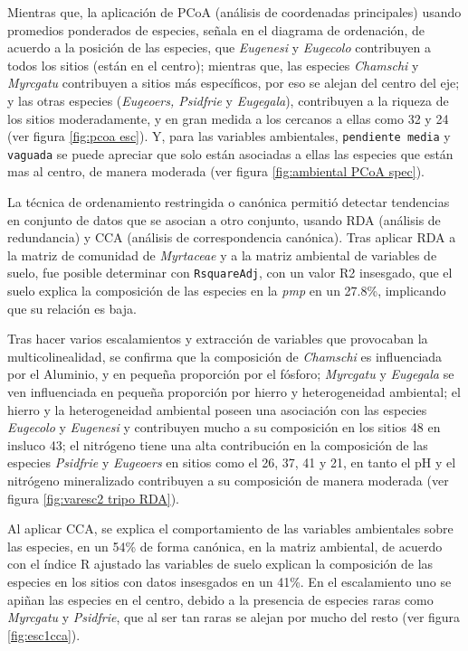 \documentclass[11pt,]{article}
\begin{document}
Mientras que, la aplicación de PCoA (análisis de coordenadas
principales) usando promedios ponderados de especies, señala en el
diagrama de ordenación, de acuerdo a la posición de las especies, que
\emph{Eugenesi} y \emph{Eugecolo} contribuyen a todos los sitios (están
en el centro); mientras que, las especies \emph{Chamschi} y
\emph{Myrcgatu} contribuyen a sitios más específicos, por eso se alejan
del centro del eje; y las otras especies (\emph{Eugeoers, Psidfrie} y
\emph{Eugegala}), contribuyen a la riqueza de los sitios moderadamente,
y en gran medida a los cercanos a ellas como 32 y 24 (ver figura
\ref{fig:pcoa esc}). Y, para las variables ambientales,
\texttt{pendiente\ media} y \texttt{vaguada} se puede apreciar que solo
están asociadas a ellas las especies que están mas al centro, de manera
moderada (ver figura \ref{fig:ambiental PCoA spec}).

La técnica de ordenamiento restringida o canónica permitió detectar
tendencias en conjunto de datos que se asocian a otro conjunto, usando
RDA (análisis de redundancia) y CCA (análisis de correspondencia
canónica). Tras aplicar RDA a la matriz de comunidad de \emph{Myrtaceae}
y a la matriz ambiental de variables de suelo, fue posible determinar
con \texttt{RsquareAdj}, con un valor R2 insesgado, que el suelo explica
la composición de las especies en la \emph{pmp} en un 27.8\%, implicando
que su relación es baja.

Tras hacer varios escalamientos y extracción de variables que provocaban
la multicolinealidad, se confirma que la composición de \emph{Chamschi}
es influenciada por el Aluminio, y en pequeña proporción por el fósforo;
\emph{Myrcgatu} y \emph{Eugegala} se ven influenciada en pequeña
proporción por hierro y heterogeneidad ambiental; el hierro y la
heterogeneidad ambiental poseen una asociación con las especies
\emph{Eugecolo} y \emph{Eugenesi} y contribuyen mucho a su composición
en los sitios 48 en insluco 43; el nitrógeno tiene una alta contribución
en la composición de las especies \emph{Psidfrie} y \emph{Eugeoers} en
sitios como el 26, 37, 41 y 21, en tanto el pH y el nitrógeno
mineralizado contribuyen a su composición de manera moderada (ver figura
\ref{fig:varesc2 tripo RDA}).

Al aplicar CCA, se explica el comportamiento de las variables
ambientales sobre las especies, en un 54\% de forma canónica, en la
matriz ambiental, de acuerdo con el índice R ajustado las variables de
suelo explican la composición de las especies en los sitios con datos
insesgados en un 41\%. En el escalamiento uno se apiñan las especies en
el centro, debido a la presencia de especies raras como \emph{Myrcgatu}
y \emph{Psidfrie}, que al ser tan raras se alejan por mucho del resto
(ver figura \ref{fig:esc1cca}).
\end{document}

